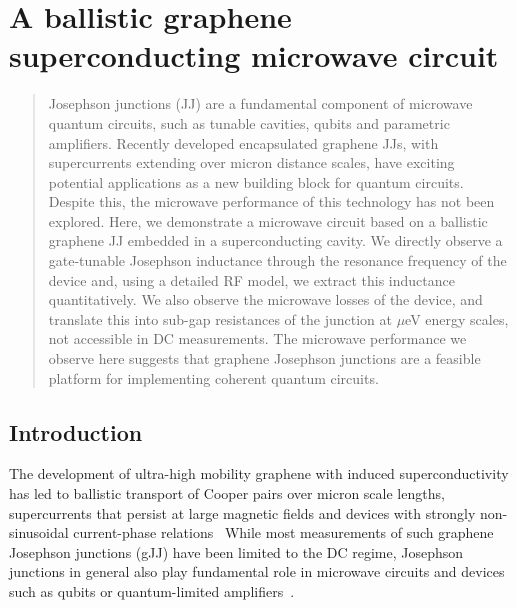 \newchapstyle
\chapter{A ballistic graphene superconducting microwave circuit}
\label{chap:gJJ}


\begin{abstract}
Josephson junctions (JJ) are a fundamental component of microwave quantum circuits, such as tunable cavities, qubits and parametric amplifiers.
%
Recently developed encapsulated graphene JJs, with supercurrents extending over micron distance scales, have exciting potential applications as a new building block for quantum circuits. 
%  
Despite this, the microwave performance of this technology has not been explored.
%  
Here, we demonstrate a microwave circuit based on a ballistic graphene JJ embedded in a superconducting cavity.
%  
We directly observe a gate-tunable Josephson inductance through the resonance frequency of the device and, using a detailed RF model, we extract this inductance quantitatively. 
%
We also observe the microwave losses of the device, and translate this into sub-gap resistances of the junction at $\mu$eV energy scales, not accessible in DC measurements.
%
The microwave performance we observe here suggests that graphene Josephson junctions are a feasible platform for implementing coherent quantum circuits.
\end{abstract}

\afterpage{\pagecolor{none}}\newpage
\section{Introduction}

\noindent The development of ultra-high mobility graphene with induced superconductivity has led to ballistic transport of Cooper pairs over micron scale lengths, supercurrents that persist at large magnetic fields and devices with strongly non-sinusoidal current-phase relations~\cite{caladoBallisticJosephsonJunctions2015d,benshalomQuantumOscillationsCritical2015,leeUltimatelyShortBallistic2015,novoselovRoadmapGraphene2012,walshGrapheneBasedJosephsonJunctionSinglePhoton2017}
While most measurements of such graphene Josephson junctions (gJJ) have been limited to the DC regime, Josephson junctions in general also play fundamental role in microwave circuits and devices such as qubits or quantum-limited amplifiers~\cite{martinisCourse13Superconducting2004,castellanos-beltranDevelopmentJosephsonParametric2010}.

